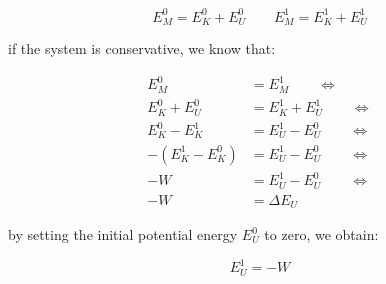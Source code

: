 \begin{equation}
E_M^0 = E_K^0 + E_U^0 \qquad E_M^1 = E_K^1 + E_U^1
\end{equation}

if the system is conservative, we know that:

\begin{equation}
\label{eq:external_work_equals_internal_energy}
\begin{aligned}
E_M^0 &= E_M^1  \qquad \Leftrightarrow \\
E_K^0 + E_U^0 &= E_K^1 + E_U^1 \qquad \Leftrightarrow \\
E_K^0 - E_K^1 &= E_U^1 - E_U^0  \qquad \Leftrightarrow \\
- (E_K^1 - E_K^0) &= E_U^1 - E_U^0  \qquad \Leftrightarrow \\
- W &= E_U^1 - E_U^0  \qquad \Leftrightarrow \\
- W &= \Delta E_U
\end{aligned}
\end{equation}

by setting the initial potential energy
$E_U^0$ to zero, we obtain:

\begin{equation}
\label{eq:EW}
E_U^1 = -W 
\end{equation}


